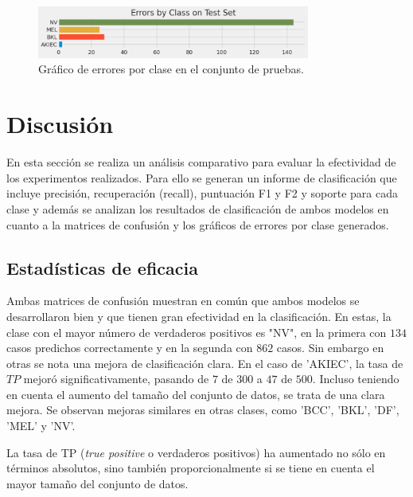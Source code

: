 \begin{figure}[H]
   \begin{center}
       \includegraphics[width=0.8\textwidth]{./Graphics/errorByClass_p3.png}
           \caption{Gráfico de errores por clase en el conjunto de pruebas.\label{fig:class_errors_p3}}
   \end{center}
\end{figure}
        
       
\section{Discusión}

En esta sección se realiza un análisis comparativo para evaluar la efectividad de los experimentos realizados. Para ello se generan un informe de clasificación que incluye precisión, recuperación (recall), puntuación F1 y F2 y soporte para cada clase y además se analizan los resultados de clasificación de ambos modelos en cuanto a la matrices de confusión y los gráficos de errores por clase generados.

\subsection*{Estadísticas de eficacia}\label{sub:accuracy_statistic_p1}

Ambas matrices de confusión muestran en común que ambos modelos se desarrollaron bien y que tienen gran efectividad en la clasificación. En estas, la clase con el mayor número de verdaderos positivos es "NV", en la primera con $134$ casos predichos correctamente y en la segunda con $862$ casos. Sin embargo en otras se nota una mejora de clasificación clara. En el caso de 'AKIEC', la tasa de $TP$ mejoró significativamente, pasando de $7$ de $300$ a $47$ de $500$. Incluso teniendo en cuenta el aumento del tamaño del conjunto de datos, se trata de una clara mejora. Se observan mejoras similares en otras clases, como 'BCC', 'BKL', 'DF', 'MEL' y 'NV'. 

La tasa de TP (\textit{true positive} o verdaderos positivos) ha aumentado no sólo en términos absolutos, sino también proporcionalmente si se tiene en cuenta el mayor tamaño del conjunto de datos.

